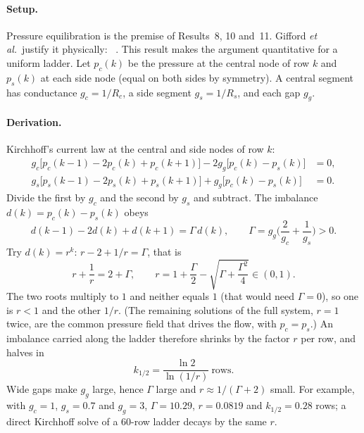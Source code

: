 \label{res:ladder}

\paragraph{Setup.} Pressure equilibration is the premise of Results~8, 10 and~11. Gifford
\emph{et al.}\ justify it physically: ~\cite[pp.~4497--4498]{b1}.
This result makes the argument quantitative for a uniform ladder. Let $p_c(k)$ be the pressure at
the central node of row $k$ and $p_s(k)$ at each side node (equal on both sides by symmetry). A
central segment has conductance $g_c=1/R_c$, a side segment $g_s=1/R_s$, and each gap $g_g$.

\paragraph{Derivation.} Kirchhoff's current law at the central and side nodes of row $k$:
\begin{align}
g_c\big[p_c(k-1)-2p_c(k)+p_c(k+1)\big]-2g_g\big[p_c(k)-p_s(k)\big]&=0,\\
g_s\big[p_s(k-1)-2p_s(k)+p_s(k+1)\big]+g_g\big[p_c(k)-p_s(k)\big]&=0.
\end{align}
Divide the first by $g_c$ and the second by $g_s$ and subtract. The imbalance
$d(k)=p_c(k)-p_s(k)$ obeys
\begin{equation}
d(k-1)-2d(k)+d(k+1)=\Gamma\,d(k),\qquad \Gamma=g_g\Big(\frac{2}{g_c}+\frac{1}{g_s}\Big)>0 .
\end{equation}
Try $d(k)=r^k$: $r-2+1/r=\Gamma$, that is
\begin{equation}
r+\frac1r=2+\Gamma,\qquad r=1+\frac{\Gamma}{2}-\sqrt{\Gamma+\frac{\Gamma^2}{4}}\in(0,1).
\end{equation}
The two roots multiply to $1$ and neither equals $1$ (that would need $\Gamma=0$), so one is $r<1$
and the other $1/r$. (The remaining solutions of the full system, $r=1$ twice, are the common
pressure field that drives the flow, with $p_c=p_s$.) An imbalance carried along the ladder
therefore shrinks by the factor $r$ per row, and halves in
\begin{equation}
k_{1/2}=\frac{\ln2}{\ln(1/r)}\ \text{rows}.
\end{equation}
Wide gaps make $g_g$ large, hence $\Gamma$ large and $r\approx1/(\Gamma+2)$ small. For example, with
$g_c=1$, $g_s=0.7$ and $g_g=3$, $\Gamma=10.29$, $r=0.0819$ and $k_{1/2}=0.28$ rows; a direct Kirchhoff
solve of a $60$-row ladder decays by the same $r$.

